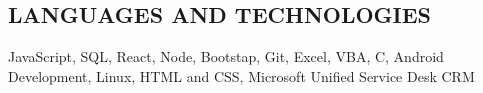 \documentclass[10pt]{res} %
\begin{document}
\begin{resume}
\section{LANGUAGES AND TECHNOLOGIES}
\vspace{4pt}
  	JavaScript, SQL, React, Node, Bootstap, Git, Excel, VBA, C, Android Development, Linux, HTML and CSS, Microsoft Unified Service Desk CRM
  	
\end{resume}
\end{document}
